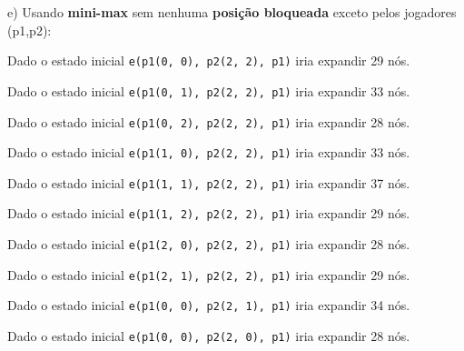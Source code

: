\documentclass[11pt]{article}
\begin{document}
e) Usando \textbf{mini-max} sem nenhuma \textbf{posição bloqueada} exceto pelos jogadores (p1,p2):

\hspace{0,45cm}Dado o estado inicial \verb|e(p1(0, 0), p2(2, 2), p1)| iria expandir 29 nós.

\hspace{0,45cm}Dado o estado inicial \verb|e(p1(0, 1), p2(2, 2), p1)| iria expandir 33 nós.

\hspace{0,45cm}Dado o estado inicial \verb|e(p1(0, 2), p2(2, 2), p1)| iria expandir 28 nós.

\hspace{0,45cm}Dado o estado inicial \verb|e(p1(1, 0), p2(2, 2), p1)| iria expandir 33 nós.

\hspace{0,45cm}Dado o estado inicial \verb|e(p1(1, 1), p2(2, 2), p1)| iria expandir 37 nós.

\hspace{0,45cm}Dado o estado inicial \verb|e(p1(1, 2), p2(2, 2), p1)| iria expandir 29 nós.

\hspace{0,45cm}Dado o estado inicial \verb|e(p1(2, 0), p2(2, 2), p1)| iria expandir 28 nós.

\hspace{0,45cm}Dado o estado inicial \verb|e(p1(2, 1), p2(2, 2), p1)| iria expandir 29 nós.

\hspace{0,45cm}Dado o estado inicial \verb|e(p1(0, 0), p2(2, 1), p1)| iria expandir 34 nós.

\hspace{0,45cm}Dado o estado inicial \verb|e(p1(0, 0), p2(2, 0), p1)| iria expandir 28 nós.


\end{document}
